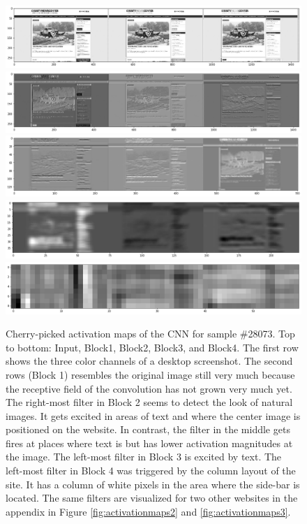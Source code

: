 \begin{figure}
    \centering
    \includegraphics[clip,width=\columnwidth]{resources/analysis/feat-map-28073-0.png}\\
    \includegraphics[clip,width=\columnwidth]{resources/analysis/feat-map-28073-1.png}\\
    \includegraphics[clip,width=\columnwidth]{resources/analysis/feat-map-28073-2.png}\\
    \includegraphics[clip,width=\columnwidth]{resources/analysis/feat-map-28073-3.png}\\
    \includegraphics[clip,width=\columnwidth]{resources/analysis/feat-map-28073-4.png}\\
    \caption[Activation maps of the CNN for sample \#28073]{Cherry-picked activation maps of the CNN for sample \#28073. Top to bottom: Input, Block1, Block2, Block3, and Block4. The first row shows the three color channels of a desktop screenshot. The second rows (Block 1) resembles the original image still very much because the receptive field of the convolution has not grown very much yet. The right-most filter in Block 2 seems to detect the look of natural images. It gets excited in areas of text and where the center image is positioned on the website. In contrast, the filter in the middle gets fires at places where text is but has lower activation magnitudes at the image. The left-most filter in Block 3 is excited by text. The left-most filter in Block 4 was triggered by the column layout of the site. It has a column of white pixels in the area where the side-bar is located. The same filters are visualized for two other websites in the appendix in Figure \ref{fig:activationmaps2} and \ref{fig:activationmaps3}.}

\end{figure}

